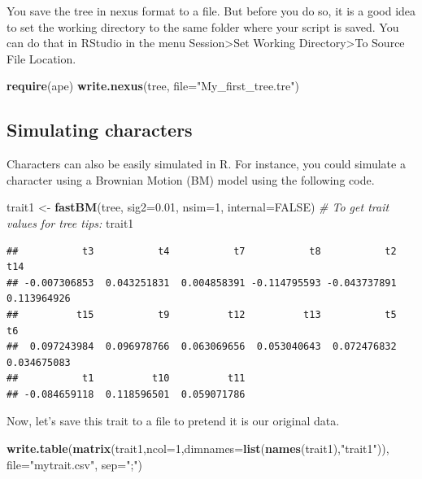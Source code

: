 \documentclass[
]{book}
\newenvironment{Shaded}{\begin{snugshade}}{\end{snugshade}}
\newcommand{\AttributeTok}[1]{\textcolor[rgb]{0.13,0.29,0.53}{#1}}
\newcommand{\CommentTok}[1]{\textcolor[rgb]{0.56,0.35,0.01}{\textit{#1}}}
\newcommand{\ConstantTok}[1]{\textcolor[rgb]{0.56,0.35,0.01}{#1}}
\newcommand{\DecValTok}[1]{\textcolor[rgb]{0.00,0.00,0.81}{#1}}
\newcommand{\FloatTok}[1]{\textcolor[rgb]{0.00,0.00,0.81}{#1}}
\newcommand{\FunctionTok}[1]{\textcolor[rgb]{0.13,0.29,0.53}{\textbf{#1}}}
\newcommand{\NormalTok}[1]{#1}
\newcommand{\OtherTok}[1]{\textcolor[rgb]{0.56,0.35,0.01}{#1}}
\newcommand{\StringTok}[1]{\textcolor[rgb]{0.31,0.60,0.02}{#1}}
\begin{document}
You save the tree in nexus format to a file. But before you do so, it is a good idea to set the working directory to the same folder where your script is saved. You can do that in RStudio in the menu Session\textgreater Set Working Directory\textgreater To Source File Location.

\begin{Shaded}
\begin{Highlighting}[]
\FunctionTok{require}\NormalTok{(ape)}
\FunctionTok{write.nexus}\NormalTok{(tree, }\AttributeTok{file=}\StringTok{"My\_first\_tree.tre"}\NormalTok{)}
\end{Highlighting}
\end{Shaded}

\subsection{Simulating characters}\label{simulating-characters}

Characters can also be easily simulated in R. For instance, you could simulate a character using a Brownian Motion (BM) model using the following code.

\begin{Shaded}
\begin{Highlighting}[]
\NormalTok{trait1 }\OtherTok{\textless{}{-}} \FunctionTok{fastBM}\NormalTok{(tree, }\AttributeTok{sig2=}\FloatTok{0.01}\NormalTok{, }\AttributeTok{nsim=}\DecValTok{1}\NormalTok{, }\AttributeTok{internal=}\ConstantTok{FALSE}\NormalTok{)}
\CommentTok{\# To get trait values for tree tips:}
\NormalTok{trait1}
\end{Highlighting}
\end{Shaded}

\begin{verbatim}
##           t3           t4           t7           t8           t2          t14 
## -0.007306853  0.043251831  0.004858391 -0.114795593 -0.043737891  0.113964926 
##          t15           t9          t12          t13           t5           t6 
##  0.097243984  0.096978766  0.063069656  0.053040643  0.072476832  0.034675083 
##           t1          t10          t11 
## -0.084659118  0.118596501  0.059071786
\end{verbatim}

Now, let's save this trait to a file to pretend it is our original data.

\begin{Shaded}
\begin{Highlighting}[]
\FunctionTok{write.table}\NormalTok{(}\FunctionTok{matrix}\NormalTok{(trait1,}\AttributeTok{ncol=}\DecValTok{1}\NormalTok{,}\AttributeTok{dimnames=}\FunctionTok{list}\NormalTok{(}\FunctionTok{names}\NormalTok{(trait1),}\StringTok{"trait1"}\NormalTok{)), }\AttributeTok{file=}\StringTok{"mytrait.csv"}\NormalTok{, }\AttributeTok{sep=}\StringTok{";"}\NormalTok{)}
\end{Highlighting}
\end{Shaded}
\end{document}
